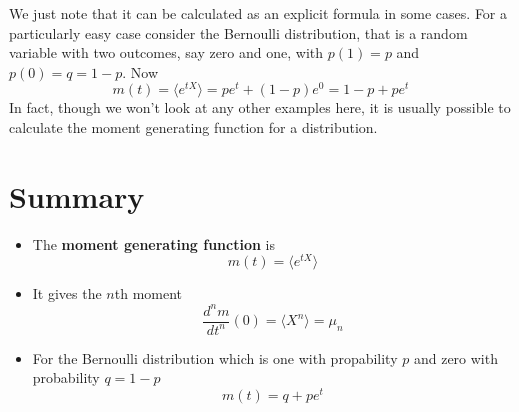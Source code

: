 \documentclass[11pt,a4paper]{scrartcl}
\begin{document}
We just note that it can be
calculated as an explicit formula in some cases. For a particularly
easy case consider the Bernoulli distribution, that is a random
variable with two outcomes, say zero and one, with $p(1)=p$ and $p(0)=q=1-p$. Now
\begin{equation}
m(t)=\langle e^{tX}\rangle=pe^t+(1-p)e^0=1-p+pe^t
\end{equation}
In fact, though we won't look at any other examples here, it is
usually possible to calculate the moment generating function for a
distribution.

\newpage

\section*{Summary}

\begin{itemize}
\item The \textbf{moment generating function} is
  \begin{equation}
    m(t)=\langle e^{tX}\rangle
  \end{equation}
\item It gives the $n$th moment
  \begin{equation}
\frac{d^nm}{dt^n}(0)=\langle X^n\rangle=\mu_n
\end{equation}
\item For the Bernoulli distribution which is one with propability $p$ and zero with probability $q=1-p$
  \begin{equation}
    m(t)=q+pe^t
  \end{equation}
  \end{itemize}
\end{document}
